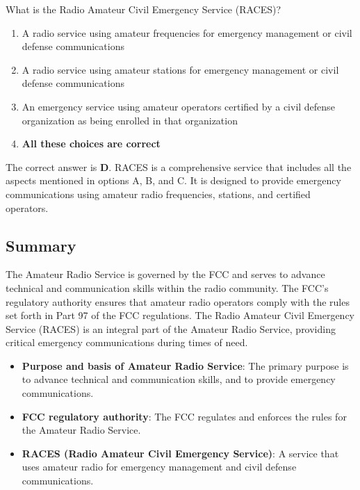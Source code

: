 \begin{tcolorbox}[colback=gray!10!white,colframe=black!75!black,title={T1A10}]
    What is the Radio Amateur Civil Emergency Service (RACES)?
    \begin{enumerate}[label=\Alph*),noitemsep]
        \item A radio service using amateur frequencies for emergency management or civil defense communications
        \item A radio service using amateur stations for emergency management or civil defense communications
        \item An emergency service using amateur operators certified by a civil defense organization as being enrolled in that organization
        \item \textbf{All these choices are correct}
    \end{enumerate}
\end{tcolorbox}
The correct answer is \textbf{D}. RACES is a comprehensive service that includes all the aspects mentioned in options A, B, and C. It is designed to provide emergency communications using amateur radio frequencies, stations, and certified operators.

\subsection*{Summary}
The Amateur Radio Service is governed by the FCC and serves to advance technical and communication skills within the radio community. The FCC's regulatory authority ensures that amateur radio operators comply with the rules set forth in Part 97 of the FCC regulations. The Radio Amateur Civil Emergency Service (RACES) is an integral part of the Amateur Radio Service, providing critical emergency communications during times of need.

\begin{itemize}
    \item \textbf{Purpose and basis of Amateur Radio Service}: The primary purpose is to advance technical and communication skills, and to provide emergency communications.
    \item \textbf{FCC regulatory authority}: The FCC regulates and enforces the rules for the Amateur Radio Service.
    \item \textbf{RACES (Radio Amateur Civil Emergency Service)}: A service that uses amateur radio for emergency management and civil defense communications.
\end{itemize}
